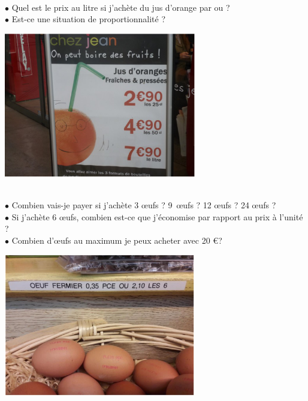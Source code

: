 \begin{minipage}{7cm}
    \\ [5mm]
   $\bullet$ Quel est le prix au litre si j’achète du jus d’orange par  ou  ? \\
   $\bullet$ Est-ce une situation de proportionnalité ?
\end{minipage}
\qquad
\begin{minipage}{10cm}   
   \includegraphics[width=8.4cm]{Transversal/Images/Tra8_crpe_oranges}
\end{minipage}

\bigskip

\begin{minipage}{7cm}
    \\ [5mm]
   $\bullet$ Combien vais-je payer si j’achète 3 \oe ufs ? 9~\oe ufs ? 12 \oe ufs ? 24 \oe ufs ? \\
   $\bullet$ Si j’achète 6 \oe ufs, combien est-ce que j’économise par rapport au prix à l’unité ? \\
   $\bullet$ Combien d’\oe ufs au maximum je peux acheter avec 20 \euro ?
\end{minipage}
\qquad
\begin{minipage}{10cm}
      \includegraphics[width=8.4cm]{Transversal/Images/Tra8_crpe_oeufs}
\end{minipage}


